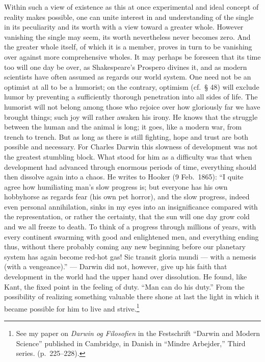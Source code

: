 \documentclass[12pt]{book}
\newcommand{\opage}[1]{\marginnote{\footnotesize\textit{[#1]}}}
\begin{document}
Within such a view of existence as this at once experimental and ideal concept of reality makes
possible, \opage{172}one can unite interest in and understanding of the single in its peculiarity
and its worth with a view toward a greater whole. However vanishing the single may seem, its worth
nevertheless never becomes zero. And the greater whole itself, of which it is a member, proves in
turn to be vanishing over against more comprehensive wholes. It may perhaps be foreseen that its time
too will one day be over, as Shakespeare's Prospero divines it, and as modern scientists have often
assumed as regards our world system. One need not be an optimist at all to be a humorist; on the
contrary, optimism (cf.\ § 48) will exclude humor by preventing a sufficiently thorough penetration
into all sides of life. The humorist will not belong among those who rejoice over how gloriously far
we have brought things; such joy will rather awaken his irony. He knows that the struggle between the
human and the animal is long; it goes, like a modern war, from trench to trench. But as long as there
is still fighting, hope and trust are both possible and necessary. For Charles Darwin this slowness
of development was not the greatest stumbling block. What stood for him as a difficulty was that when
development had advanced through enormous periods of time, everything should then dissolve again into
a chaos. He writes to Hooker (9 Feb.\ 1865): ``I quite agree how humiliating man's slow progress is; but
everyone has his own hobbyhorse as regards fear (his own pet horror), and the slow progress, indeed even
personal annihilation, sinks in my eyes into an insignificance compared with the representation, or
rather the certainty, that the sun will one day grow cold and we all freeze to death. To think of a
progress through millions of years, with every continent swarming with good and enlightened men, and
everything ending thus, without there probably coming any new beginning before our planetary system
has again become red-hot gas! Sic transit gloria mundi --- with a nemesis (with a vengeance).'' --- Darwin did not, however, give up his faith that development in the
world had the upper hand over dissolution. He found, like Kant, the fixed point in the feeling of
duty. ``Man can do his duty.'' From the possibility of realizing something valuable there
\opage{173}shone at last the light in which it became possible for him to live and
strive.\footnote{See my paper on \textit{Darwin og Filosofien} in the Festschrift ``Darwin and Modern
Science'' published in Cambridge, in Danish in ``Mindre Arbejder,'' Third series. (p.~225--228).}
\end{document}
